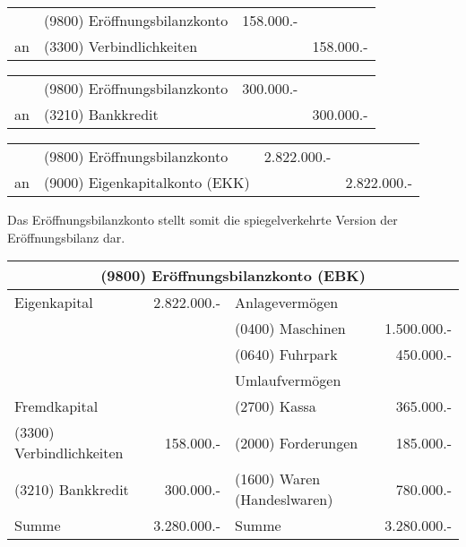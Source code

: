 \documentclass[parskip=half,12pt,a4paper]{scrartcl}
\begin{document}
\begin{center}
	\begin{tabularx}{\textwidth}{rXrr}
		\toprule
		& (9800) Eröffnungsbilanzkonto & 158.000.- &\\
		an & (3300) Verbindlichkeiten & & 158.000.-\\
		\bottomrule
	\end{tabularx}
\end{center}

\begin{center}
	\begin{tabularx}{\textwidth}{rXrr}
		\toprule
		& (9800) Eröffnungsbilanzkonto & 300.000.- &\\
		an & (3210) Bankkredit & & 300.000.-\\
		\bottomrule
	\end{tabularx}
\end{center}

\begin{center}
\begin{tabularx}{\textwidth}{rXrr}
 \toprule
    & (9800) Eröffnungsbilanzkonto & 2.822.000.- &\\
 an & (9000) Eigenkapitalkonto (EKK) & & 2.822.000.-\\
\bottomrule
\end{tabularx}
\end{center}

Das Eröffnungsbilanzkonto stellt somit die spiegelverkehrte Version der Eröffnungsbilanz dar.

\begin{center}
	\begin{tabular}{lr|lr}
		\multicolumn{4}{c}{(9800) Eröffnungsbilanzkonto (EBK)}\\
		\toprule
		Eigenkapital & 2.822.000.- & Anlagevermögen &\\
		& & (0400) Maschinen & 1.500.000.-\\
		& & (0640) Fuhrpark & 450.000.-\\
		& & Umlaufvermögen &\\
		Fremdkapital & & (2700) Kassa & 365.000.-\\
		(3300) Verbindlichkeiten & 158.000.- & (2000) Forderungen & 185.000.-\\
		(3210) Bankkredit & 300.000.- & (1600) Waren (Handeslwaren) & 780.000.-\\
		\bottomrule
		Summe & 3.280.000.- & Summe & 3.280.000.-\\
	\end{tabular}
\end{center}
\end{document}
